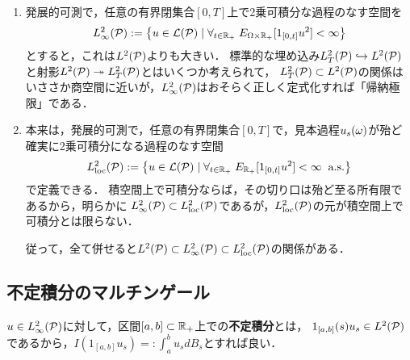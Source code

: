\documentclass[uplatex,dvipdfmx]{jsreport}
\begin{document}
\begin{notation}\mbox{}
    \begin{enumerate}
        \item 
        発展的可測で，任意の有界閉集合$[0,T]$上で2乗可積分な過程のなす空間を
        \[L^2_\infty(\P):=\Brace{u\in\L(\P)\mid\forall_{t\in\R_+}\;E_{\Om\times\R_+}[1_{[0,t]}u^2]<\infty}\]
        とすると，これは$L^2(\P)$よりも大きい．
        標準的な埋め込み$L^2_T(\P)\mono L^2(\P)$と射影$L^2(\P)\epi L^2_T(\P)$とはいくつか考えられて，
        $L^2_T(\P)\subset L^2(\P)$の関係はいささか商空間に近いが，$L^2_\infty(\P)$はおそらく正しく定式化すれば「帰納極限」である．
        \item 本来は，発展的可測で，任意の有界閉集合$[0,T]$で，見本過程$u_s(\om)$が殆ど確実に2乗可積分になる過程のなす空間
        \[L^2_\loc(\P):=\Brace{u\in\L(\P)\mid\forall_{t\in\R_+}\;E_{\R_+}[1_{[0,t]}u^2]<\infty\;\as}\]
        で定義できる．
        積空間上で可積分ならば，その切り口は殆ど至る所有限であるから，明らかに
        $L^2_\infty(\P)\subset L^2_\loc(\P)$であるが，$L^2_\loc(\P)$の元が積空間上で可積分とは限らない．
        
        従って，全て併せると$L^2(\P)\subset L^2_\infty(\P)\subset L^2_\loc(\P)$の関係がある．
    \end{enumerate}
\end{notation}

\subsection{不定積分のマルチンゲール}

\begin{definition}
    $u\in L^2_\infty(\P)$に対して，区間$[a,b]\subset\R_+$上での\textbf{不定積分}とは，
    $1_{[a,b]}(s)u_s\in L^2(\P)$であるから，$I(1_{[a,b]}u_s)=:\int^b_au_sdB_s$とすれば良い．
\end{definition}
\end{document}

